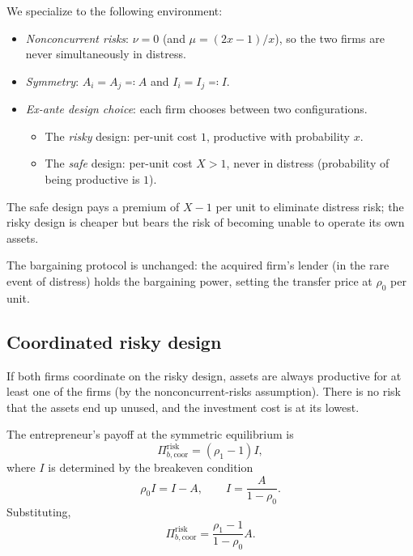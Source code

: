 \documentclass[11pt,a4paper,oneside]{book}
\theoremstyle{plain}
\theoremstyle{definition}
\theoremstyle{remark}
\numberwithin{equation}{chapter}
\begin{document}
We specialize to the following environment:
\begin{itemize}
  \item \emph{Nonconcurrent risks}: $\nu = 0$ (and $\mu = (2x - 1)/x$), so the two firms are never simultaneously in distress.
  \item \emph{Symmetry}: $A_i = A_j \eqqcolon A$ and $I_i = I_j \eqqcolon I$.
  \item \emph{Ex-ante design choice}: each firm chooses between two configurations.
  \begin{itemize}
    \item The \emph{risky} design: per-unit cost $1$, productive with probability $x$.
    \item The \emph{safe} design: per-unit cost $X > 1$, never in distress (probability of being productive is $1$).
  \end{itemize}
\end{itemize}
The safe design pays a premium of $X - 1$ per unit to eliminate distress risk; the risky design is cheaper but bears the risk of becoming unable to operate its own assets.

The bargaining protocol is unchanged: the acquired firm's lender (in the rare event of distress) holds the bargaining power, setting the transfer price at $\rho_0$ per unit.

\subsection{Coordinated risky design}

If both firms coordinate on the risky design, assets are always productive for at least one of the firms (by the nonconcurrent-risks assumption).
There is no risk that the assets end up unused, and the investment cost is at its lowest.

The entrepreneur's payoff at the symmetric equilibrium is
\begin{equation*}
  \Pi_{b, \text{coor}}^{\text{risk}} = (\rho_1 - 1) I,
\end{equation*}
where $I$ is determined by the breakeven condition
\begin{equation*}
  \rho_0 I = I - A,
  \qquad I = \frac{A}{1 - \rho_0}.
\end{equation*}
Substituting,
\begin{equation}\label{eq:ma-coord-risk}
  \Pi_{b, \text{coor}}^{\text{risk}} = \frac{\rho_1 - 1}{1 - \rho_0} A.
\end{equation}
\end{document}
